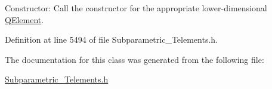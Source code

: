 Constructor\+: Call the constructor for the appropriate lower-\/dimensional \hyperlink{classoomph_1_1QElement}{Q\+Element}. 



Definition at line 5494 of file Subparametric\+\_\+\+Telements.\+h.



The documentation for this class was generated from the following file\+:\begin{DoxyCompactItemize}
\item 
\hyperlink{Subparametric__Telements_8h}{Subparametric\+\_\+\+Telements.\+h}\end{DoxyCompactItemize}
